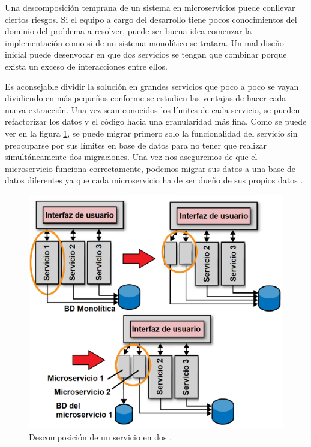 \documentclass[11pt,spanish,listoffigures]{tfgetsinf}
\begin{document}
Una descomposición temprana de un sistema en microservicios puede conllevar ciertos riesgos. Si el equipo a cargo del desarrollo tiene pocos conocimientos del dominio del problema a resolver, puede  ser buena idea comenzar la implementación como si de un sistema monolítico se tratara. Un mal diseño inicial puede desenvocar en que dos servicios se tengan que combinar porque exista un exceso de interacciones entre ellos. 

Es aconsejable dividir la solución en grandes servicios que poco a poco se vayan dividiendo en más pequeños conforme se estudien las ventajas de hacer cada nueva extracción. Una vez sean conocidos los límites de cada servicio, se pueden refactorizar los datos y el código hacia una granularidad más fina. Como se puede ver en la figura \ref{fig:refactoring}, se puede migrar primero solo la funcionalidad del servicio sin preocuparse por sus límites en base de datos para no tener que realizar simultáneamente dos migraciones. Una vez nos aseguremos de que el microservicio funciona correctamente, podemos migrar sus datos a una base de datos diferentes ya que cada microservicio ha de ser dueño de sus propios datos \cite{Richards2016}.

\begin{figure}[h]
\centering
\includegraphics[scale=0.45]{refactoring}
\caption{Descomposición de un servicio en dos \cite{Richards2016}.}
\label{fig:refactoring}
\end{figure}
\end{document}
